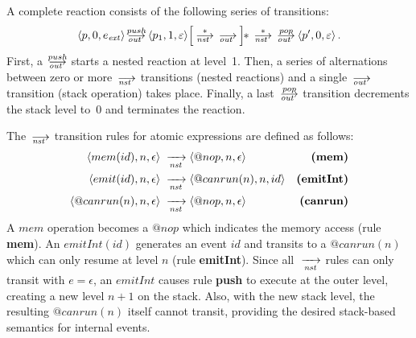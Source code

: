 A complete reaction consists of the following series of transitions:
\begin{align*}
  \<p,0,e_\ext>\out[push]\<p_1,1,\nil>
  \Big[\null\nst[*]\null\out\null\Big]\!\!\ast
  \null\nst[*]\null\out[pop]\<p',0,\nil>\,.
\end{align*}
%
%
First, a~$\out[push]$ starts a nested reaction at level~1.
Then, a series of alternations between zero or more~$\nst$ transitions (nested reactions) and a
single~$\out$ transition (stack operation) takes place.
Finally, a last~$\out[pop]$ transition decrements the
stack level to~0 and terminates the reaction.

The~$\nst$ transition rules for atomic expressions are defined as follows:
%
{ \setlength{\jot}{20pt}
\begin{align*}
\langle mem(id), n, \epsilon \rangle &\;\xrightarrow[\mathit{nst}]{\;}
\langle @nop, n, \epsilon \rangle
    & \textbf{(mem)}        \\
\langle emit(id), n, \epsilon \rangle &\;\xrightarrow[\mathit{nst}]{\;}
\langle @canrun(n), n, id \rangle
    & \textbf{(emitInt)}    \\
\langle @canrun(n), n, \epsilon \rangle &\;\xrightarrow[\mathit{nst}]{\;}
\langle @nop, n, \epsilon \rangle
    & \textbf{(canrun)}     \\
\end{align*}
}
%
A $mem$ operation becomes a $@nop$ which indicates the memory access (rule
\textbf{mem}).
An $emitInt(id)$ generates an event $id$ and transits to a $@canrun(n)$ which
can only resume at level $n$ (rule \textbf{emitInt}).
Since all $\;\xrightarrow[\mathit{nst}]{\;}$ rules can only transit with $e=\epsilon$, an $emitInt$ causes
rule \textbf{push} to execute at the outer level, creating a new level $n+1$ on
the stack.
Also, with the new stack level, the resulting $@canrun(n)$ itself cannot
transit, providing the desired stack-based semantics for internal events.

